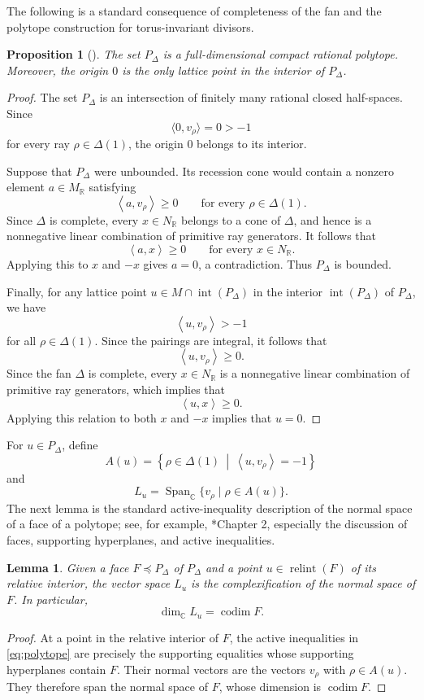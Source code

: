 \documentclass[colorlinks,11pt,reqno]{amsart}
\newtheorem{lemma}[theorem]{Lemma}
\newtheorem{proposition}[theorem]{Proposition}
\theoremstyle{definition}
\theoremstyle{remark}
\numberwithin{equation}{section}
\numberwithin{equation}{section}
\newcommand{\RR}{\mathbb{R}}
\newcommand{\Pair}[2]{\left\langle #1,#2\right\rangle}
\newcommand{\C}{\mathbb{C}}
\newcommand{\R}{\mathbb{R}}
\DeclareMathOperator{\Span}{Span}
\DeclareMathOperator{\relint}{relint}
\DeclareMathOperator{\codim}{codim}
\begin{document}
The following is a standard consequence of completeness of the fan
and the polytope construction for torus-invariant divisors.
\begin{proposition}[\cites{Cox, Fulton}]\label{lem:interior-origin}%
The set $P_\Delta$ is a full-dimensional compact rational polytope.
Moreover, the origin $0$ is the only lattice point in the interior of \(P_\Delta\).
\end{proposition}
\begin{proof}
The set \(P_\Delta\) is an intersection of finitely many rational closed half-spaces. Since
\[
\langle 0, v_\rho\rangle = 0 >-1
\]
for every ray $\rho \in \Delta(1)$, the origin $0$ belongs to its interior.

Suppose that \(P_\Delta\) were unbounded. Its recession cone would contain a nonzero element \(a\in M_{\RR}\) satisfying
\[
\Pair{a}{v_\rho}\geq 0 \qquad \text{for every }\rho\in\Delta(1).
\]
Since \(\Delta\) is complete, every \(x\in N_{\R}\) belongs to a cone of \(\Delta\), and hence is a nonnegative linear combination of primitive ray generators. It follows that
\[
\Pair{a}{x} \geq 0 \qquad  \text{for every }x\in N_{\R}.
\]
Applying this to \(x\) and \(-x\) gives \(a=0\), a contradiction.
Thus \(P_\Delta\) is bounded.

Finally, for any lattice point \(u\in M\cap\operatorname{int}(P_\Delta)\) in the interior $\operatorname{int}(P_\Delta)$ of $P_\Delta$, we have
\[
\Pair{u}{v_\rho}>-1
\]
for all \(\rho\in\Delta(1)\). Since the pairings are integral, it follows that
\[
\Pair{u}{v_\rho} \geq 0.
\]
Since the fan $\Delta$ is complete, every $x \in N_\R$ is a nonnegative linear combination of primitive ray generators, which implies that
\[
  \Pair{u}{x} \geq 0.
\]
Applying this relation to both $x$ and $-x$ implies that \(u=0\).
\end{proof}

For \(u\in P_\Delta\), define
\[
A(u) = \left\{ \rho\in\Delta(1) \ \middle|\   \Pair{u}{v_\rho}=-1 \right\}
\]
and
\[
L_u = \Span_{\C}\{v_\rho\mid\rho\in A(u)\}.
\]
The next lemma is the standard active-inequality description of the normal space of a face of a polytope; see, for example, \cite{Ziegler}*{Chapter 2}, especially the discussion of faces, supporting hyperplanes, and active inequalities.

\begin{lemma}\label{lem:normal-space}
Given a face \(F\preceq P_\Delta\) of $P_\Delta$ and a point \(u\in\relint(F)\) of its relative interior, the vector space \(L_u\) is the complexification of the normal space of \(F\). In particular,
\[
\dim_{\C} L_u= \codim F.
\]
\end{lemma}
\begin{proof}
At a point in the relative interior of \(F\), the active inequalities in \eqref{eq:polytope} are precisely the supporting equalities whose supporting hyperplanes contain \(F\). Their normal
vectors are the vectors \(v_\rho\) with \(\rho\in A(u)\). They therefore span the normal space of \(F\), whose dimension is \(\codim F\).
\end{proof}
\end{document}
